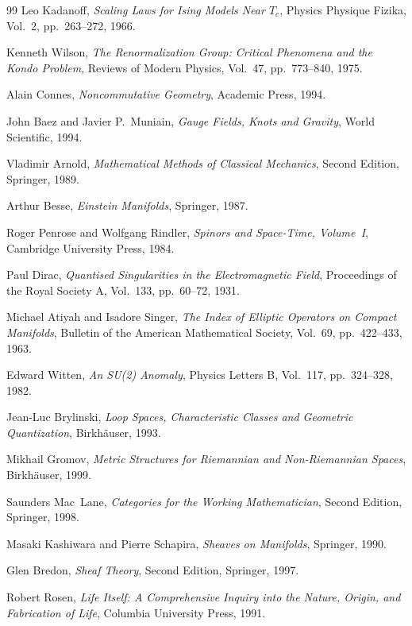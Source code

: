 \documentclass[12pt,a4paper]{article}
\begin{document}
\begin{thebibliography}{99}
Leo Kadanoff,
\textit{Scaling Laws for Ising Models Near $T_c$},
Physics Physique Fizika, Vol.~2, pp.~263--272, 1966.

Kenneth Wilson,
\textit{The Renormalization Group: Critical Phenomena and the Kondo Problem},
Reviews of Modern Physics, Vol.~47, pp.~773--840, 1975.

Alain Connes,
\textit{Noncommutative Geometry},
Academic Press, 1994.

John Baez and Javier P.~Muniain,
\textit{Gauge Fields, Knots and Gravity},
World Scientific, 1994.

Vladimir Arnold,
\textit{Mathematical Methods of Classical Mechanics},
Second Edition, Springer, 1989.

Arthur Besse,
\textit{Einstein Manifolds},
Springer, 1987.

Roger Penrose and Wolfgang Rindler,
\textit{Spinors and Space-Time, Volume~I},
Cambridge University Press, 1984.

Paul Dirac,
\textit{Quantised Singularities in the Electromagnetic Field},
Proceedings of the Royal Society A, Vol.~133, pp.~60--72, 1931.

Michael Atiyah and Isadore Singer,
\textit{The Index of Elliptic Operators on Compact Manifolds},
Bulletin of the American Mathematical Society, Vol.~69, pp.~422--433, 1963.

Edward Witten,
\textit{An SU(2) Anomaly},
Physics Letters B, Vol.~117, pp.~324--328, 1982.

Jean-Luc Brylinski,
\textit{Loop Spaces, Characteristic Classes and Geometric Quantization},
Birkh\"{a}user, 1993.

Mikhail Gromov,
\textit{Metric Structures for Riemannian and Non-Riemannian Spaces},
Birkh\"{a}user, 1999.

Saunders Mac~Lane,
\textit{Categories for the Working Mathematician},
Second Edition, Springer, 1998.

Masaki Kashiwara and Pierre Schapira,
\textit{Sheaves on Manifolds},
Springer, 1990.

Glen Bredon,
\textit{Sheaf Theory},
Second Edition, Springer, 1997.

Robert Rosen,
\textit{Life Itself: A Comprehensive Inquiry into the Nature, Origin, and Fabrication of Life},
Columbia University Press, 1991.


\end{thebibliography}
\end{document}
